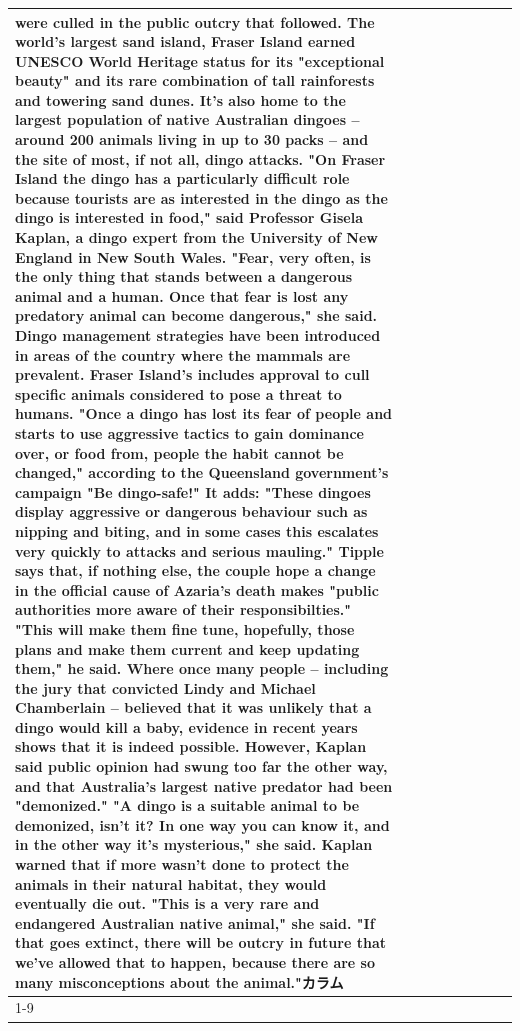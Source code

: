 \begin{table}[H]
\begin{tabular}{lllrlllll}
were culled in the public outcry that followed. The world's largest sand island, Fraser Island earned UNESCO World Heritage status for its "exceptional beauty" and its rare combination of tall rainforests and towering sand dunes. It's also home to the largest population of native Australian dingoes -- around 200 animals living in up to 30 packs -- and the site of most, if not all, dingo attacks. "On Fraser Island the dingo has a particularly difficult role because tourists are as interested in the dingo as the dingo is interested in food," said Professor Gisela Kaplan, a dingo expert from the University of New England in New South Wales. "Fear, very often, is the only thing that stands between a dangerous animal and a human. Once that fear is lost any predatory animal can become dangerous," she said. Dingo management strategies have been introduced in areas of the country where the mammals are prevalent. Fraser Island's includes approval to cull specific animals considered to pose a threat to humans. "Once a dingo has lost its fear of people and starts to use aggressive tactics to gain dominance over, or food from, people the habit cannot be changed," according to the Queensland government's campaign "Be dingo-safe!" It adds: "These dingoes display aggressive or dangerous behaviour such as nipping and biting, and in some cases this escalates very quickly to attacks and serious mauling." Tipple says that, if nothing else, the couple hope a change in the official cause of Azaria's death makes "public authorities more aware of their responsibilties." "This will make them fine tune, hopefully, those plans and make them current and keep updating them," he said. Where once many people -- including the jury that convicted Lindy and Michael Chamberlain -- believed that it was unlikely that a dingo would kill a baby, evidence in recent years shows that it is indeed possible. However, Kaplan said public opinion had swung too far the other way, and that Australia's largest native predator had been "demonized." "A dingo is a suitable animal to be demonized, isn't it? In one way you can know it, and in the other way it's mysterious," she said. Kaplan warned that if more wasn't done to protect the animals in their natural habitat, they would eventually die out. "This is a very rare and endangered Australian native animal," she said. "If that goes extinct, there will be outcry in future that we've allowed that to happen, because there are so many misconceptions about the animal."カラム \\
\cline{1-9}

\end{tabular}
\end{table}

